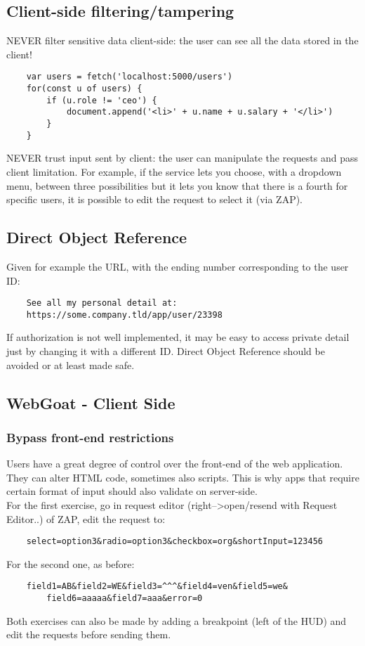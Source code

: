 \documentclass[a4paper, 10pt, titlepage]{article}
\begin{document}
\subsection{Client-side filtering/tampering}
NEVER filter sensitive data client-side: the user can see all the data stored in the client!
\begin{lstlisting}
	var users = fetch('localhost:5000/users')
	for(const u of users) {
		if (u.role != 'ceo') {
			document.append('<li>' + u.name + u.salary + '</li>')
		}
	}
\end{lstlisting}
NEVER trust input sent by client: the user can manipulate the requests and pass client limitation. For example, if the service lets you choose, with a dropdown menu, between three possibilities but it lets you know that there is a fourth for specific users, it is possible to edit the request to select it (via ZAP).

\subsection{Direct Object Reference}
Given for example the URL, with the ending number corresponding to the user ID:
\begin{lstlisting}
	See all my personal detail at:
	https://some.company.tld/app/user/23398
\end{lstlisting}
If authorization is not well implemented, it may be easy to access private detail just by changing it with a different ID. Direct Object Reference should be avoided or at least made safe.


\subsection{WebGoat - Client Side}
\subsubsection*{Bypass front-end restrictions}
Users have a great degree of control over the front-end of the web application. They can alter HTML code, sometimes also scripts. This is why apps that require certain format of input should also validate on server-side. \\
For the first exercise, go in request editor (right-->open/resend with Request Editor..) of ZAP, edit the request to:
\begin{lstlisting}
	select=option3&radio=option3&checkbox=org&shortInput=123456
\end{lstlisting}
For the second one, as before:
\begin{lstlisting}
	field1=AB&field2=WE&field3=^^^&field4=ven&field5=we&
		field6=aaaaa&field7=aaa&error=0
\end{lstlisting}
Both exercises can also be made by adding a breakpoint (left of the HUD) and edit the requests before sending them.
\end{document}
